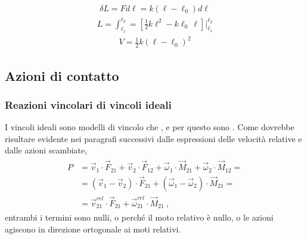 \documentclass[letterpaper,10pt,italian]{jupyterBook}
\begin{document}
\sphinxAtStartPar
{} 
\begin{equation*}
\begin{split}\delta L =  F d \ell = k (\ell - \ell_0) d \ell\end{split}
\end{equation*}\begin{equation*}
\begin{split}L = \int_{\ell_1}^{\ell_2} = \left[ \frac{1}{2} k \ell^2 - k \ell_0 \, \ell \right]\bigg|_{\ell_1}^{\ell_2}\end{split}
\end{equation*}\begin{equation*}
\begin{split}V = \frac{1}{2} k (\ell - \ell_0)^2\end{split}
\end{equation*}

\subsection{Azioni di contatto}
\label{\detokenize{ch/mechanics/actions-examples:azioni-di-contatto}}\label{\detokenize{ch/mechanics/actions-examples:physics-hs-mechanics-actions-contact}}

\subsubsection{Reazioni vincolari di vincoli ideali}
\label{\detokenize{ch/mechanics/actions-examples:reazioni-vincolari-di-vincoli-ideali}}\label{\detokenize{ch/mechanics/actions-examples:physics-hs-mechanics-actions-contact-ideal-constraints}}
\sphinxAtStartPar
I vincoli ideali sono modelli di vincolo che , e per questo sono . Come dovrebbe risultare evidente nei paragrafi successivi dalle espressioni delle velocità relative e dalle azioni scambiate,
\begin{equation*}
\begin{split}\begin{aligned}
P & = \vec{v}_1     \cdot \vec{F}_{21} + \vec{v}_2     \cdot \vec{F}_{12} 
    + \vec{\omega}_1 \cdot \vec{M}_{21} + \vec{\omega}_2 \cdot \vec{M}_{12} = \\ 
  & = ( \vec{v}_1 - \vec{v}_2 ) \cdot \vec{F}_{21}
    + ( \vec{\omega}_1 - \vec{\omega}_2 ) \cdot \vec{M}_{21} = \\ 
  & = \vec{v}^{rel}_{21} \cdot \vec{F}_{21}
    + \vec{\omega}^{rel}_{21} \cdot \vec{M}_{21} \ ,
\end{aligned}\end{split}
\end{equation*}
\sphinxAtStartPar
entrambi i termini sono nulli, o perché il moto relativo è nullo, o le azioni agiscono in direzione ortogonale ai moti relativi.
\end{document}
